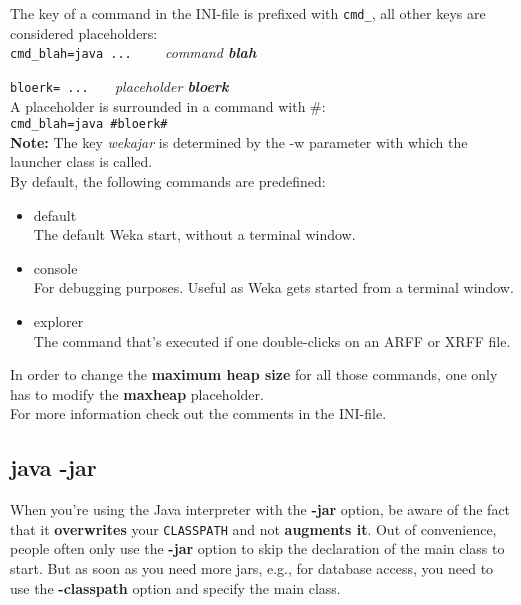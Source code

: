 The key of a command in the INI-file is prefixed with \verb=cmd_=, all
other keys are considered placeholders:\\

\verb^cmd_blah=java ...    ^ \emph{command \textbf{blah}}

\verb^bloerk= ...   ^ \emph{placeholder \textbf{bloerk}}\\

\noindent A placeholder is surrounded in a command with \#:\\

\verb^cmd_blah=java #bloerk#^\\

\noindent \textbf{Note:} The key \emph{wekajar} is determined by the
-w parameter with which the launcher class is called.\\

\noindent By default, the following commands are predefined:

\begin{itemize}
\item default\\ The default Weka start, without a terminal window.
\item console\\ For debugging purposes. Useful as Weka gets started from a terminal window.
\item explorer\\ The command that's executed if one double-clicks on an ARFF or XRFF file.
\end{itemize}

\noindent In order to change the \textbf{maximum heap size} for all those commands, one only has
to modify the \textbf{maxheap} placeholder.\\

\noindent For more information check out the comments in the INI-file.

\subsection{java -jar}

When you're using the Java interpreter with the \textbf{-jar} option,
be aware of the fact that it \textbf{overwrites} your \verb=CLASSPATH=
and not \textbf{augments it}. Out of convenience, people often only
use the \textbf{-jar} option to skip the declaration of the main class to
start. But as soon as you need more jars, e.g., for database access,
you need to use the \textbf{-classpath} option and specify the main class.\\

